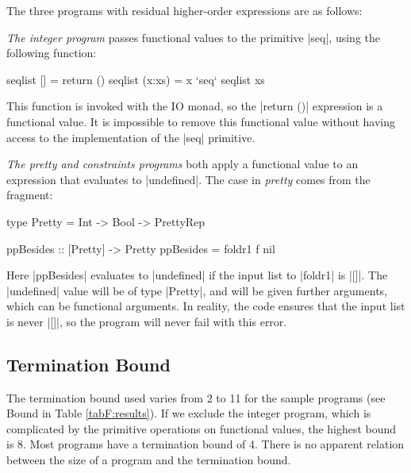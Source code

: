 The three programs with residual higher-order expressions are as follows:

\begin{example}
\textit{The integer program} passes functional values to the primitive |seq|, using the following function:

\begin{code}
seqlist [] = return ()
seqlist (x:xs) = x `seq` seqlist xs
\end{code}

This function is invoked with the IO monad, so the |return ()| expression is a functional value. It is impossible to remove this functional value without having access to the implementation of the |seq| primitive.
\end{example}

\begin{example}
\textit{The pretty and constraints programs} both apply a functional value to an expression that evaluates to |undefined|. The case in \textit{pretty} comes from the fragment:

\begin{comment}
\begin{code}
data PrettyRep = PrettyRep
\end{code}
\end{comment}
\begin{code}
type Pretty = Int -> Bool -> PrettyRep

ppBesides :: [Pretty] -> Pretty
ppBesides = foldr1 f nil
\end{code}

Here |ppBesides| evaluates to |undefined| if the input list to |foldr1| is |[]|. The |undefined| value will be of type |Pretty|, and will be given further arguments, which can be functional arguments. In reality, the code ensures that the input list is never |[]|, so the program will never fail with this error.
\end{example}

\subsection{Termination Bound}

The termination bound used varies from 2 to 11 for the sample programs (see Bound in Table \ref{tabF:results}). If we exclude the integer program, which is complicated by the primitive operations on functional values, the highest bound is 8. Most programs have a termination bound of 4. There is no apparent relation between the size of a program and the termination bound.

